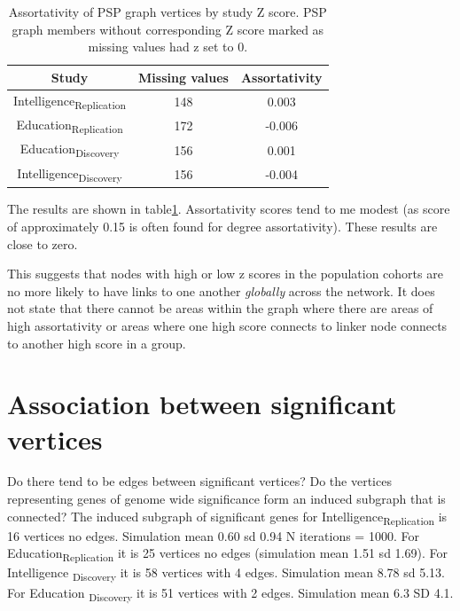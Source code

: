  \begin{table}[]
     \centering
     \begin{tabular}{ccc}
     \toprule
         Study & Missing values  & Assortativity\\
         \midrule
         Intelligence\textsubscript{Replication} & 148 & 0.003\\
         Education\textsubscript{Replication} & 172 & -0.006\\
         Education\textsubscript{Discovery} & 156 & 0.001\\
         Intelligence\textsubscript{Discovery} & 156 & -0.004\\
         \bottomrule
     \end{tabular}
     \caption{Assortativity of PSP graph vertices by study Z score. PSP graph members without corresponding Z score marked as missing values had z set to 0.}
     \label{tab:Assortativity of PSP graph and z scores}
 \end{table}


The results are shown in table\ref{tab:Assortativity of PSP graph and z scores}. Assortativity scores tend to me modest (as score of approximately 0.15 is often found for degree assortativity). These results are close to zero. 

This suggests that nodes with high or low z scores in the population cohorts are no more likely to have links to one another \textit{globally} across the network. It does not state that there cannot be areas within the graph where there are areas of high assortativity or areas where one high score connects to linker node connects to another high score in a group.

\section{Association between significant vertices}
Do there tend to be edges between significant vertices? Do the vertices representing genes of genome wide significance form an induced subgraph that is connected?
The induced subgraph  of significant genes for Intelligence\textsubscript{Replication} is 16 vertices no edges. Simulation mean 0.60 sd 0.94 N iterations = 1000. For Education\textsubscript{Replication} it is 25 vertices no edges (simulation mean 1.51 sd 1.69). For Intelligence \textsubscript{Discovery} it is 58 vertices with 4 edges. Simulation mean 8.78 sd 5.13. For Education \textsubscript{Discovery} it is 51 vertices with 2 edges. Simulation mean 6.3 SD 4.1.

